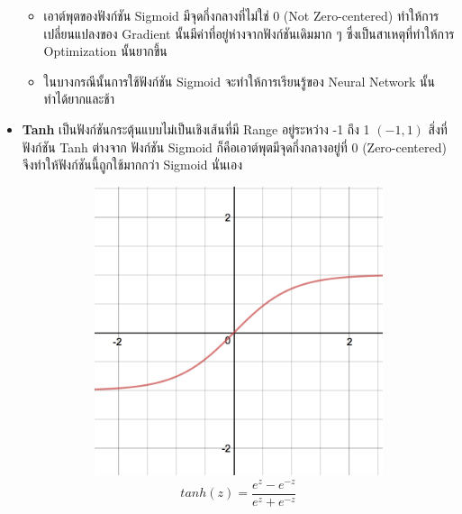 \begin{itemize}
\begin{itemize}
        \item เอาต์พุตของฟังก์ชัน Sigmoid มีจุดกึ่งกลางที่ไม่ใช่ 0 (Not Zero-centered) ทำให้การเปลี่ยนแปลงของ Gradient 
        นั้นมีค่าที่อยู่ห่างจากฟังก์ชันเดิมมาก ๆ ซึ่งเป็นสาเหตุที่ทำให้การ Optimization นั้นยากขึ้น

        \item ในบางกรณีนั้นการใช้ฟังก์ชัน Sigmoid จะทำให้การเรียนรู้ของ Neural Network นั้นทำได้ยากและช้า
    \end{itemize}

    \item \textbf{Tanh} เป็นฟังก์ชันกระตุ้นแบบไม่เป็นเชิงเส้นที่มี Range อยู่ระหว่าง -1 ถึง 1 $(-1, 1)$ สิ่งที่ฟังก์ชัน Tanh ต่างจาก%
    ฟังก์ชัน Sigmoid ก็คือเอาต์พุตมีจุดกึ่งกลางอยู่ที่ 0 (Zero-centered) จึงทำให้ฟังก์ชันนี้ถูกใช้มากกว่า Sigmoid นั่นเอง
    \begin{figure}[H]
        \centering
        \begin{subfigure}{0.5\textwidth}
            \centering
            \includegraphics[width=0.9\linewidth]{fig/actfunc_tanh.png}
            \caption{%
                \begin{equation}
                    tanh(z) = \frac{e^{z} - e^{-z}}{e^{z} + e^{-z}}
                \end{equation}
            }
            \label{fig:actfunc_tanh}
        \end{subfigure}%
        \begin{subfigure}{0.5\textwidth}

\end{subfigure}
\end{figure}
\end{itemize}
